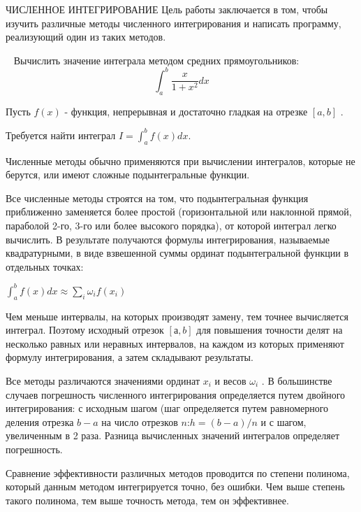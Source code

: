 

 {ЧИСЛЕННОЕ ИНТЕГРИРОВАНИЕ}
\setcounter{page}{2}
\normalfont
{}
Цель работы заключается в том, чтобы изучить различные методы численного интегрирования и написать программу, реализующий один из таких методов.

\ 
Вычислить значение интеграла методом средних прямоугольников:
 $$\int_a^b\frac{x}{1+x^2}dx$$

Пусть   $f(x)$ - функция, непрерывная и достаточно гладкая на отрезке $[a,b]$ . 

Требуется найти интеграл $I=\int_a^b f(x) dx$. 

Численные методы обычно применяются при вычислении интегралов, которые не берутся, или имеют сложные подынтегральные функции.

Все численные методы строятся на том, что подынтегральная функция приближенно заменяется более простой (горизонтальной или наклонной прямой, параболой 2-го, 3-го или более высокого порядка), от которой интеграл легко вычислить. В результате получаются формулы интегрирования, называемые квадратурными, в виде взвешенной суммы ординат подынтегральной функции в отдельных точках:
 
$\int_a^b f(x) dx\approx \sum_i \omega_i f(x_i)$

Чем меньше интервалы, на которых производят замену, тем точнее вычисляется интеграл. Поэтому исходный отрезок $[а,b]$ для повышения точности делят на несколько равных или неравных интервалов, на каждом из которых применяют формулу интегрирования, а затем складывают результаты.

Все методы различаются значениями ординат $x_i$  и весов $\omega_i$ . 
В большинстве случаев погрешность численного интегрирования определяется путем двойного интегрирования: с исходным шагом (шаг определяется путем равномерного деления отрезка $b - a$ на число отрезков $n$:$ h = (b - a) / n$ и с шагом, увеличенным в 2 раза. Разница вычисленных значений интегралов определяет погрешность.

Сравнение эффективности различных методов проводится по степени полинома, который данным методом интегрируется точно, без ошибки. Чем выше степень такого полинома, тем выше точность метода, тем он эффективнее. 

